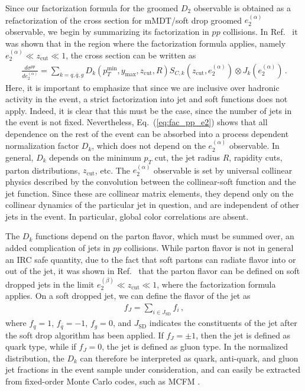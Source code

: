 \documentclass[a4paper,11pt]{article}
\newcommand{\ecf}[2]{e_{#1}^{(#2)}}
\def\zcut{z_{\text{cut}}}
\DeclareRobustCommand{\Eq}[1]{Eq.~(\ref{#1})}
\DeclareRobustCommand{\Ref}[1]{Ref.~\cite{#1}}
\begin{document}
Since our factorization formula for the groomed $D_2$ observable is obtained as a refactorization of the cross section for mMDT/soft drop groomed $\ecf{2}{\alpha}$ observable, we begin by summarizing its factorization in $pp$ collisions.
In \Ref{Frye:2016aiz} it was shown that in the region where the factorization formula applies, namely $\ecf{2}{\alpha} \ll \zcut \ll 1$, the cross section can be written as
\begin{align}\label{eq:fac_pp_e2}
\frac{d\sigma^{pp}}{d\ecf{2}{\alpha}}=\sum\limits_{k=q,\bar q, g}D_k(p_T^{\text{min}}, y_\text{max}, \zcut, R) S_{C,k}(\zcut, \ecf{2}{\alpha})\otimes J_k (\ecf{2}{\alpha})\,.
\end{align}
Here, it is important to emphasize that since we are inclusive over hadronic activity in the event, a strict factorization into jet and soft functions does not apply. Indeed, it is clear that this must be the case, since the number of jets in the event is not fixed. Nevertheless, \Eq{eq:fac_pp_e2} shows that all dependence on the rest of the event can be absorbed into a process dependent normalization factor $D_k$, which does not depend on the $\ecf{2}{\alpha}$ observable.  In general, $D_k$ depends on the minimum $p_T$ cut, the jet radius $R$, rapidity cuts,  parton distributions, $\zcut$, etc.  The $\ecf{2}{\alpha}$ observable is set by universal collinear physics described by the convolution between the collinear-soft function and the jet function.  Since these are collinear matrix elements, they depend only on the collinear dynamics of the particular jet in question, and are independent of other jets in the event. In particular, global color correlations are absent.

The $D_k$ functions depend on the parton flavor, which must be summed over, an added complication of jets in $pp$ collisions. While parton flavor is not in general an IRC safe quantity, due to the fact that soft partons can radiate flavor into or out of the jet, it was shown in \Ref{Frye:2016aiz}  that the parton flavor can be defined on soft dropped jets in the limit $\ecf{2}{\beta} \ll \zcut \ll 1$, where the factorization formula applies. On a soft dropped jet, we can define the flavor of the jet as
\begin{align}
f_J=\sum\limits_{i\in J_{\text{SD}}} f_i\,,
\end{align}
where $f_q=1$, $f_{\bar q}=-1$, $f_g=0$, and $J_{\text{SD}}$ indicates the constituents of the jet after the soft drop algorithm has been applied. If $f_J=\pm 1$, then the jet is defined as quark type, while if $f_J=0$, the jet is defined as gluon type. In the normalized distribution,  the $D_k$ can therefore  be interpreted as quark, anti-quark, and gluon jet fractions in the event sample under consideration, and can easily be extracted from fixed-order Monte Carlo codes, such as MCFM \cite{Campbell:1999ah,Campbell:2010ff,Campbell:2011bn}.
\end{document}
